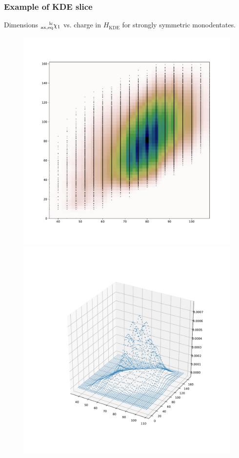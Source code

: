 \documentclass[xcolor=dvipsnames]{beamer}
\begin{document}
\begin{frame}
\frametitle{Example of KDE slice}
Dimensions $\prescript{\textrm{lc}}{\textrm{ax,eq}}{\chi}_1$ vs. charge in $H_{\textrm{KDE}}$ for strongly symmetric monodentates.
\begin{figure}[ht] 
	\begin{minipage}[b]{0.5\linewidth}
		\centering
		\includegraphics[width=1\linewidth]{img/strongsymMonodentates_heatmap.pdf} 
		\vspace{2ex}
	\end{minipage}%
	\begin{minipage}[b]{0.5\linewidth}
		\centering
		\includegraphics[width=1\linewidth]{img/strongsymMonodentates_3Dhists.pdf} 

\end{minipage}
\end{figure}
\end{frame}
\end{document}
